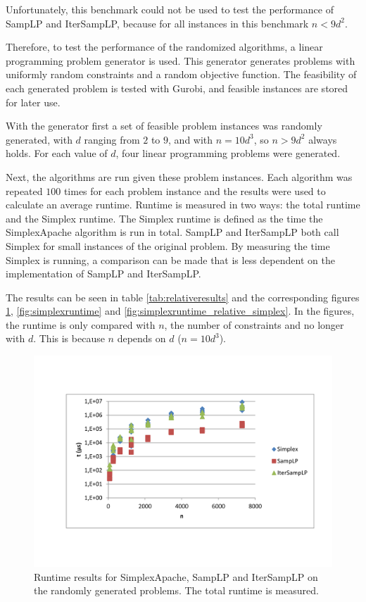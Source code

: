\documentclass[nocopyrightspace]{acm_proc_article-sp}
\begin{document}
Unfortunately, this benchmark could not be used to test the performance of SampLP and IterSampLP, because for all instances in this benchmark $n < 9d^2$. 

Therefore, to test the performance of the randomized algorithms, a linear programming problem generator is used. This generator generates problems with uniformly random constraints and a random objective function. The feasibility of each generated problem is tested with Gurobi, and feasible instances are stored for later use.

With the generator first a set of feasible problem instances was randomly generated, with $d$ ranging from $2$ to $9$, and with $n = 10d^3$, so $n > 9d^2$ always holds. For each value of $d$, four linear programming problems were generated. 

Next, the algorithms are run given these problem instances. Each algorithm was repeated $100$ times for each problem instance and the results were used to calculate an average runtime. Runtime is measured in two ways: the total runtime and the Simplex runtime. The Simplex runtime is defined as the time the SimplexApache algorithm is run in total. SampLP and IterSampLP both call Simplex for small instances of the original problem. By measuring the time Simplex is running, a comparison can be made that is less dependent on the implementation of SampLP and IterSampLP.

The results can be seen in table \ref{tab:relativeresults} and the corresponding figures \ref{fig:totalruntime}, \ref{fig:simplexruntime} and \ref{fig:simplexruntime_relative_simplex}. In the figures, the runtime is only compared with $n$, the number of constraints and no longer with $d$. This is because $n$ depends on $d$ ($n=10d^3$). 

\begin{figure}[h!]
\includegraphics[width=\columnwidth]{../Results/totalruntime.pdf}
\caption{Runtime results for SimplexApache, SampLP and IterSampLP on the randomly generated problems. The total runtime is measured.}
\label{fig:totalruntime}
\end{figure}
\end{document}
